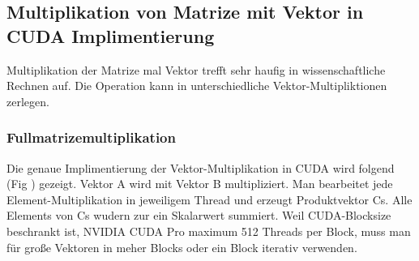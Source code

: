



\subsection{Multiplikation von Matrize mit Vektor in CUDA Implimentierung}
Multiplikation der Matrize mal Vektor trefft sehr haufig in wissenschaftliche Rechnen auf. Die Operation kann in unterschiedliche Vektor-Multipliktionen zerlegen.

\subsubsection{Fullmatrizemultiplikation}

Die genaue Implimentierung der Vektor-Multiplikation in CUDA wird folgend (Fig ) 
gezeigt. Vektor A wird mit Vektor B multipliziert. 
Man bearbeitet jede Element-Multiplikation in jeweiligem Thread und erzeugt Produktvektor Cs.  
Alle Elements von Cs wudern zur ein Skalarwert summiert. 
Weil CUDA-Blocksize beschrankt ist, 
 NVIDIA CUDA Pro
maximum 512 Threads per Block, muss man für große Vektoren in meher Blocks oder ein Block iterativ verwenden.

